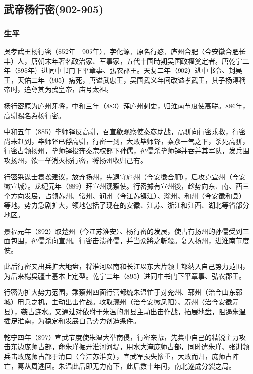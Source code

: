 
\subsection{武帝杨行密\tiny(902-905)}

\subsubsection{生平}

吳孝武王杨行密（852年－905年），字化源，原名行愍，庐州合肥（今安徽合肥长丰）人，唐朝末年著名政治家、军事家，五代十国時期吴国政權奠定者。唐乾宁二年（895年）进同中书门下平章事、弘农郡王。天复二年（902）进中书令、封吴王，天佑二年（905）病死，唐谥武忠王，吴国武义年间改谥孝武王，其子杨溥稱帝时，追尊其为武皇帝，庙号太祖。

杨行密原为庐州牙将，中和三年（883）拜庐州刺史，归淮南节度使高骈。886年，高骈賜名為杨行密。

中和五年（885）毕师铎反高骈，召宣歙观察使秦彦助战，高骈向行密求救，行密尚未赶到，毕师铎已俘高骈，行密一到，大败毕师铎，秦彥一气之下，杀死高骈，行密占领扬州，毕师铎投奔秦宗权部下孙儒，孙儒杀毕师铎并吞并其军队，发兵围攻扬州，欲一举消灭杨行密，将扬州收归己有。

行密采谋士袁袭建议，放弃扬州，先退守庐州（今安徽合肥），后攻克宣州（今安徽宣城）。龙纪元年（889）拜宣州观察使。行密據有宣州後，趁势向东、南、西三个方向发展，占领苏州、常州、润州（今江苏镇江）、滁州、和州（今安徽和县）等地，势力急剧扩大，领地包括了现在的安徽、江苏、浙江和江西、湖北等省部分地区。

景福元年（892）取楚州（今江苏淮安）、杨行密的发展，使占有扬州的孙儒受到三面包围，孙儒杀向宣州。行密击溃孙儒，并当众將之斬殺。复入扬州，进淮南节度使。

此后行密又出兵扩大地盘，将淮河以南和长江以东大片领土都纳入自己势力范围，为后来楊吳疆土基本上定型。乾宁二年（895）进同中书门下平章事、弘农郡王。

行密为扩大势力范围，乘蔡州四面行营都统朱温忙于对兖州、郓州（治今山东郓城）用兵之机，主动出击作战。攻取濠州（治今安徽凤阳）、寿州（治今安徽寿县），袭占涟水。又通过对依附于朱温的州县主动出击作战，拓展地盘，阻遏朱温插足淮南，为稳定和发展自己势力创造条件。

乾宁四年（897）宣武节度使朱温大举南侵，行密亲战，先集中自己的精锐主力攻击东边庞师古部，命朱瑾掘开淮河河堤，用水大淹庞师古部，同时遣朱瑾、张训领兵击败庞师古部于清口（今江苏淮安），宣武军损失惨重，大败而归，庞师古阵亡，葛从周逃回。朱温此后即无力南下，此后数十年间，南北遂成分裂之局。

